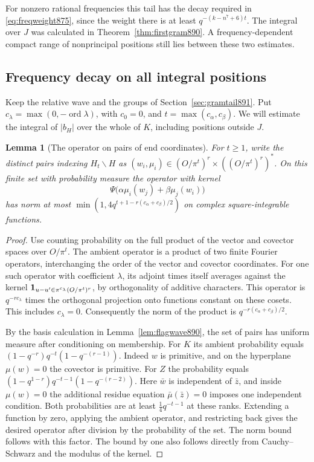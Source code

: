 \documentclass[a4paper,11pt]{article}
\newtheorem{lemma}[proposition]{Lemma}
\theoremstyle{definition}
\theoremstyle{remark}
\numberwithin{equation}{section}
\begin{document}
For nonzero rational frequencies this tail has the decay required
in \eqref{eq:freqweight875}, since the weight there is at least
\(q^{-(k-n^7+6)t}\). The integral over \(J\) was calculated in
Theorem~\ref{thm:firstgram890}. A frequency-dependent compact
range of nonprincipal positions still lies between these two
estimates.
\clearpage

\subsection{Frequency decay on all integral positions}
\label{sec:integralfreq892}

Keep the relative wave and the groups of
Section~\ref{sec:gramtail891}. Put
\(c_\lambda=\max(0,-\operatorname{ord}\lambda)\), with \(c_0=0\),
and \(t=\max(c_\alpha,c_\beta)\). We will estimate the integral
of \(|b_H|\) over the whole of \(K\), including positions outside \(J\).

\begin{lemma}[The operator on pairs of end coordinates]
\leavevmode\label{lem:incidentoperator892}
For \(t\ge1\), write the distinct pairs indexing \(H_t\backslash H\)
as \((w_i,\mu_i)\in (O/\pi^t)^r\times ((O/\pi^t)^r)^*\).
On this finite set with probability measure the operator with
kernel
\[
             \Psi\big(\alpha\mu_i(w_j)+\beta\mu_j(w_i)\big)
\]
has norm at most \(\min(1,4q^{t+1-r(c_\alpha+c_\beta)/2})\)
on complex square-integrable functions.
\end{lemma}
\begin{proof}
Use counting probability on the full product of the vector and
covector spaces over \(O/\pi^t\). The ambient operator is a
product of two finite Fourier operators, interchanging the order
of the vector and covector coordinates. For one such operator
with coefficient \(\lambda\), its adjoint times itself averages
against the kernel \({\bf1}_{u-u'\in\pi^{c_\lambda}(O/\pi^t)^r}\),
by orthogonality of additive characters. This operator is
\(q^{-rc_\lambda}\) times the orthogonal projection onto functions
constant on these cosets. This includes \(c_\lambda=0\).
Consequently the norm of the product is
\(q^{-r(c_\alpha+c_\beta)/2}\).

By the basis calculation in Lemma~\ref{lem:flagwave890},
the set of pairs has uniform measure after conditioning on
membership. For \(K\) its ambient probability equals
\((1-q^{-r})q^{-t}(1-q^{-(r-1)})\). Indeed \(w\) is primitive,
and on the hyperplane \(\mu(w)=0\) the covector is primitive.
For \(Z\) the probability equals
\((1-q^{1-r})q^{-t-1}(1-q^{-(r-2)})\). Here \(\bar w\) is
independent of \(\bar z\), and inside \(\mu(w)=0\) the additional
residue equation \(\bar\mu(\bar z)=0\) imposes one independent
condition. Both probabilities are at least \(\tfrac14 q^{-t-1}\)
at these ranks. Extending a function by zero, applying the ambient
operator, and restricting back gives the desired operator after
division by the probability of the set. The norm bound follows
with this factor. The bound by one also follows directly from
Cauchy--Schwarz and the modulus of the kernel.
\end{proof}
\end{document}
